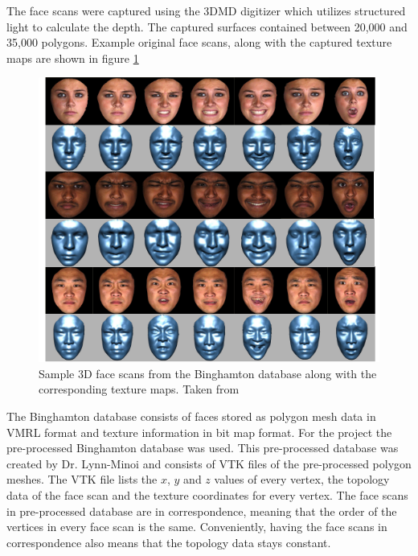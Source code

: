 \documentclass[11pt,a4paper]{report}
\begin{document}
The face scans were captured using the 3DMD digitizer which utilizes structured light to
calculate the depth. The captured surfaces contained between 20,000 and 35,000
polygons. Example original face scans, along with the captured texture maps are
shown in figure \ref{fg:binghamton} 

\begin{figure}[H]
\begin{centering}
\includegraphics[scale=0.80]{images/binghamton.png}
\par\end{centering}

\caption{Sample 3D face scans from the Binghamton database along with the
  corresponding texture maps. Taken from \cite{binghamton}}
\label{fg:binghamton}

\end{figure}
\clearpage

The Binghamton database consists of faces stored as polygon mesh data in VMRL
format and texture information in bit map format. For the project the pre-processed Binghamton
database was used. This pre-processed database was created by Dr. Lynn-Minoi
\cite{jacey} and consists of VTK files of the pre-processed polygon meshes. The
VTK file lists the $x$, $y$ and $z$ values of every vertex, the topology data
of the face scan and the texture coordinates for every vertex. The face scans in
pre-processed database are in correspondence, meaning that the order of the
vertices in every face scan is the same. Conveniently, having the face scans in
correspondence also means that the topology data stays constant.
\end{document}
